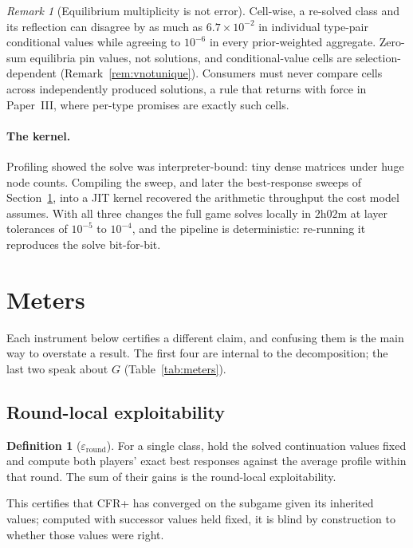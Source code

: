 \documentclass[11pt]{article}
\theoremstyle{plain}
\theoremstyle{definition}
\newtheorem{definition}[theorem]{Definition}
\theoremstyle{remark}
\newtheorem{remark}[theorem]{Remark}
\newcommand{\game}{\ensuremath{G}}
\begin{document}
\begin{remark}[Equilibrium multiplicity is not error]
\label{rem:multiplicity}
Cell-wise, a re-solved class and its reflection can disagree by as much
as $6.7\times10^{-2}$ in individual type-pair conditional values while
agreeing to $10^{-6}$ in every prior-weighted aggregate. Zero-sum
equilibria pin values, not solutions, and conditional-value cells are
selection-dependent (Remark~\ref{rem:vnotunique}). Consumers must never
compare cells across independently produced solutions, a rule that
returns with force in Paper~III, where per-type promises are exactly
such cells.
\end{remark}

\paragraph{The kernel.} Profiling showed the solve was interpreter-bound: tiny
dense matrices under huge node counts. Compiling the sweep, and later the
best-response sweeps of Section~\ref{sec:meters}, into a JIT kernel recovered
the arithmetic throughput the cost model assumes. With all three changes the
full game solves locally in $2$h$02$m at layer tolerances of $10^{-5}$ to
$10^{-4}$, and the pipeline is deterministic: re-running it reproduces the solve
bit-for-bit.

\section{Meters}\label{sec:meters}

Each instrument below certifies a different claim, and confusing them is the
main way to overstate a result. The first four are internal to the
decomposition; the last two speak about $\game$ (Table~\ref{tab:meters}).

\subsection{Round-local exploitability}

\begin{definition}[$\varepsilon_{\text{round}}$]
For a single class, hold the solved continuation values fixed and
compute both players' exact best responses against the average profile
within that round. The sum of their gains is the round-local
exploitability.
\end{definition}

This certifies that CFR+ has converged on the subgame given its inherited
values; computed with successor values held fixed, it is blind by construction
to whether those values were right.
\end{document}
